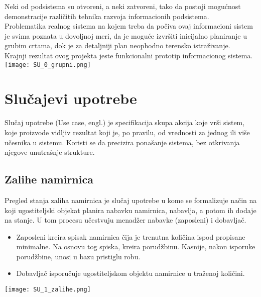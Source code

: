 \documentclass{article}
\begin{document}
Neki od podsistema su otvoreni, a neki zatvoreni, tako da postoji mogućnost demonstracije različitih tehnika razvoja
informacionih podsistema.\\

Problematika realnog sistema na kojem treba da počiva ovaj informacioni sistem je svima poznata u dovoljnoj meri, da je moguće izvršiti inicijalno planiranje u grubim crtama, dok je za detaljniji plan neophodno terensko istraživanje.\\

Krajnji rezultat ovog projekta jeste funkcionalni prototip informacionog sistema.\\

\texttt{[image: SU\_0\_grupni.png]}

\section{Slučajevi upotrebe}

Slučaj upotrebe (Use case, engl.) je specifikacija skupa akcija koje vrši sistem, koje proizvode vidljiv rezultat koji je, po pravilu, od vrednosti za jednog ili više učesnika u sistemu. Koristi se da precizira ponašanje sistema, bez otkrivanja njegove unutrašnje strukture.


\subsection{Zalihe namirnica}
Pregled stanja zaliha namirnica je slučaj upotrebe u kome se formalizuje način na koji ugostiteljski objekat planira nabavku namirnica, nabavlja, a potom ih dodaje na stanje. U tom procesu učestvuju menadžer nabavke (zaposleni) i dobavljač. 

\begin{itemize}
\item Zaposleni kreira spisak namirnica čija je trenutna količina ispod propisane minimalne. Na osnovu tog spiska, kreira porudžbinu. Kasnije, nakon isporuke porudžbine, unosi u bazu pristiglu robu.
\item Dobavljač isporučuje ugostiteljskom objektu namirnice u traženoj količini.
\end{itemize}
\texttt{[image: SU\_1\_zalihe.png]}
\end{document}
